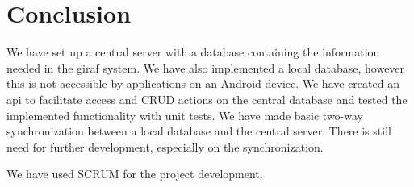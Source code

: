 \section{Conclusion}
We have set up a central server with a database containing the information needed in the \ac{giraf} system. We have also implemented a local database, however this is not accessible by applications on an Android device. We have created an \ac{api} to facilitate access and CRUD actions on the central database and tested the implemented functionality with unit tests. We have made basic two-way synchronization between a local database and the central server. There is still need for further development, especially on the synchronization.

We have used SCRUM for the project development. 